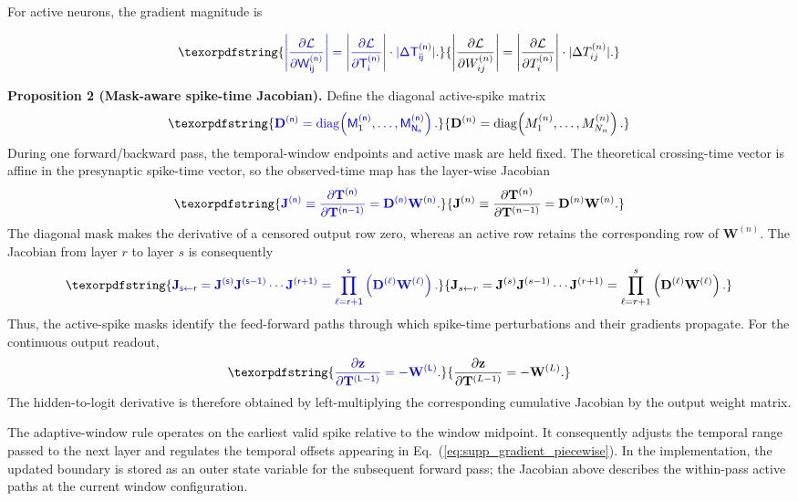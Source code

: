 \documentclass[12pt]{article}
\providecommand{\DIFaddtex}[1]{{\protect\color{blue}\sf #1}}
\providecommand{\DIFadd}[1]{\texorpdfstring{\DIFaddtex{#1}}{#1}}
\providecommand{\DIFaddbegin}{}
\providecommand{\DIFaddend}{}
\begin{document}
For active neurons, the gradient magnitude is

 \DIFaddbegin \[
\DIFadd{\left|
\frac{\partial \mathcal{L}}{\partial W_{ij}^{(n)}}
\right|
=
\left|
\frac{\partial \mathcal{L}}{\partial T_i^{(n)}}
\right|
\cdot
|\Delta T_{ij}^{(n)}|.
}\]\DIFaddend 

\textbf{Proposition 2 (\DIFaddbegin \DIFadd{Mask-aware spike-time Jacobian}\DIFaddend).}
 \DIFaddbegin \DIFadd{Define the diagonal active-spike matrix
}\[
\DIFadd{\mathbf{D}^{(n)}=\operatorname{diag}\!\left(M_1^{(n)},\ldots,M_{N_n}^{(n)}\right).
}\]\DIFaddend 
 \DIFaddbegin \DIFadd{During one forward/backward pass, the temporal-window endpoints and active mask are held fixed. The theoretical crossing-time vector is affine in the presynaptic spike-time vector, so the observed-time map has the layer-wise Jacobian
}\begin{equation}
\DIFadd{\mathbf{J}^{(n)}
\equiv
\frac{\partial \mathbf{T}^{(n)}}{\partial \mathbf{T}^{(n-1)}}
=
\mathbf{D}^{(n)}\mathbf{W}^{(n)}.
\label{eq:supp_masked_jacobian}
}\end{equation}\DIFaddend 
 \DIFaddbegin \DIFadd{The diagonal mask makes the derivative of a censored output row zero, whereas an active row retains the corresponding row of $\mathbf{W}^{(n)}$. The Jacobian from layer $r$ to layer $s$ is consequently
}\begin{equation}
\DIFadd{\mathbf{J}_{s\leftarrow r}
=
\mathbf{J}^{(s)}\mathbf{J}^{(s-1)}\cdots\mathbf{J}^{(r+1)}
=
\prod_{\ell=r+1}^{s}\left(\mathbf{D}^{(\ell)}\mathbf{W}^{(\ell)}\right).
\label{eq:supp_cumulative_jacobian}
}\end{equation}\DIFaddend 
 \DIFaddbegin \DIFadd{Thus, the active-spike masks identify the feed-forward paths through which spike-time perturbations and their gradients propagate. For the continuous output readout,
}\[
\DIFadd{\frac{\partial\mathbf{z}}{\partial\mathbf{T}^{(L-1)}}=-\mathbf{W}^{(L)}.
}\]\DIFaddend 
\DIFaddbegin \DIFadd{The hidden-to-logit derivative is therefore obtained by left-multiplying the corresponding cumulative Jacobian by the output weight matrix.
}\DIFaddend 

 \DIFaddbegin \DIFadd{The adaptive-window rule operates on the earliest valid spike relative to the window midpoint. It consequently adjusts the temporal range passed to the next layer and regulates the temporal offsets appearing in Eq.~(\ref{eq:supp_gradient_piecewise}). In the implementation, the updated boundary is stored as an outer state variable for the subsequent forward pass; the Jacobian above describes the within-pass active paths at the current window configuration.
}\DIFaddend 
\end{document}
